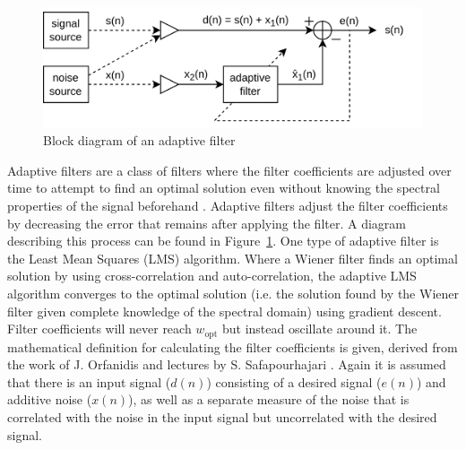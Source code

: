 \begin{figure}[h!t]
	\begin{center}
		\includegraphics[width=1.0\columnwidth]{images/adaptive_filter_block_diagram.png}
	\end{center}
	\caption{Block diagram of an adaptive filter \cite{introduction_optimal_signal_processing}}
	\label{fig:adaptive_filter_diagram}
\end{figure}

Adaptive filters are a class of filters where the filter coefficients are adjusted over time to attempt to find an optimal solution even without knowing the spectral properties of the signal beforehand \cite{adaptive_filter_and_applications}. Adaptive filters adjust the filter coefficients by decreasing the error that remains after applying the filter. A diagram describing this process can be found in Figure~\ref{fig:adaptive_filter_diagram}. 
One type of adaptive filter is the Least Mean Squares (LMS) algorithm. Where a Wiener filter finds an optimal solution by using cross-correlation and auto-correlation, the adaptive LMS algorithm converges to the optimal solution (i.e. the solution found by the Wiener filter given complete knowledge of the spectral domain) using gradient descent. Filter coefficients will never reach $w_\text{opt}$ but instead oscillate around it. The mathematical definition for calculating the filter coefficients is given, derived from the work of J. Orfanidis \cite[Ch. 7.3]{introduction_optimal_signal_processing} and lectures by S. Safapourhajari \cite{lecture_adaptive_filters_2}. Again it is assumed that there is an input signal ($d(n)$) consisting of a desired signal ($e(n)$) and additive noise ($x(n)$), as well as a separate measure of the noise that is correlated with the noise in the input signal but uncorrelated with the desired signal.

